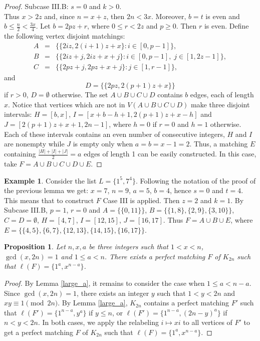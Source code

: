 \documentclass{amsart}
\newtheorem{prop}[defi]{Proposition}
\theoremstyle{definition}
\newtheorem{ex}[defi]{Example}
\numberwithin{equation}{section}
\begin{document}
\begin{proof}
\noindent Subcase III.B: $s=0$ and $k>0$.\\
Thus $x>2z$ and, since $n=x+z$, then $2n<3x$. Moreover, $b=t$ is even and $b\leq \frac{n}{2} < \frac{3x}{4}$.
Let $b=2pz+r$, where $0\leq r<2z$ and $p\geq 0$. Then $r$ is even.
Define the following vertex disjoint matchings:
$$\begin{array}{rcl}
A &=&\{\{2iz,2(i+1)z+x\}:  i\in [0,p-1]\},\\[2pt]
B &=& \{\{2iz+j,2iz+x+j\}:  i\in [0,p-1],\; j\in [1,2z-1]\},\\[2pt]
C &=& \{\{2pz+j,2pz+x+j\}:  j\in [1,r-1]\},
\end{array}$$
and
$$D = \{\{2pz,2(p+1)z+x\}\}$$
if $r>0$, $D=\emptyset$ otherwise.
The set $A\cup B\cup C\cup D$ contains $b$ edges, each of length $x$.
Notice that vertices which are not in $V(A\cup B\cup C\cup D) $ make three disjoint intervals:
$H=[b,x]$, $I=[x+b-h+1,2(p+1)z+x-h]$ and $J=[2(p+1)z+x+1,2n-1]$, where $h=0$ if $r=0$ and $h=1$ otherwise.
Each of these intervals contains an even number of consecutive integers, $H$ and $I$ are nonempty while $J$ is empty only
when $a=b=x-1=2$. Thus,
a matching $E$ containing $\frac{|H|+|I|+|J|}{2}=a$ edges of length 1 can be easily constructed.
In this case, take $F=A\cup B\cup C\cup D\cup E$.
\end{proof}


\begin{ex}
Consider the list $L=\{1^5,7^4\}$. Following the notation of the proof of the previous lemma we get:
$x=7$, $n=9$, $a=5$, $b=4$, hence $s=0$ and $t=4$. This means that to construct $F$ Case III is applied.
Then $z=2$ and $k=1$.  By Subcase III.B, $p=1$, $r=0$ and
$A=\{\{0,11\}\}$, $B=\{\{1,8\},\{2,9\},\{3,10\}\}$, $C=D=\emptyset$, $H=[4,7]$, $I=[12,15]$, $J=[16,17]$.
Thus $F=A\cup B\cup E$, where $E=\{\{4,5\},\{6,7\},\{12,13\},\{14,15\},\{16,17\}\}$.
\end{ex}



\begin{prop} \label{small_a}
Let $n,x,a$ be three integers such that $1< x< n$, $\gcd(x,2n)=1$ and $1\leq a<n$.
There exists a perfect matching $F$ of $K_{2n}$ such that $\ell(F)=\{1^a, x^{n-a}\}$.
\end{prop}

\begin{proof}
By Lemma \ref{large_a}, it remains to consider the case when $1\leq a<n-a$.
Since $\gcd(x,2n)=1$,  there exists an integer $y$ such that $1<y<2n$ and $xy\equiv 1\pmod{2n}$.
By Lemma \ref{large_a}, $K_{2n}$ contains a perfect matching $F'$ such that $\ell(F')=\{1^{n-a}, y^{a}\}$
if $y\leq n$, or $\ell(F')=\{1^{n-a}, (2n-y)^{a}\}$ if $n <y<2n$. In both cases,
we apply the relabeling $i\mapsto xi$ to all vertices of $F'$ to get 
a perfect matching $F$ of $K_{2n}$ such that $\ell(F)=\{1^a, x^{n-a}\}$.
\end{proof}
\end{document}
